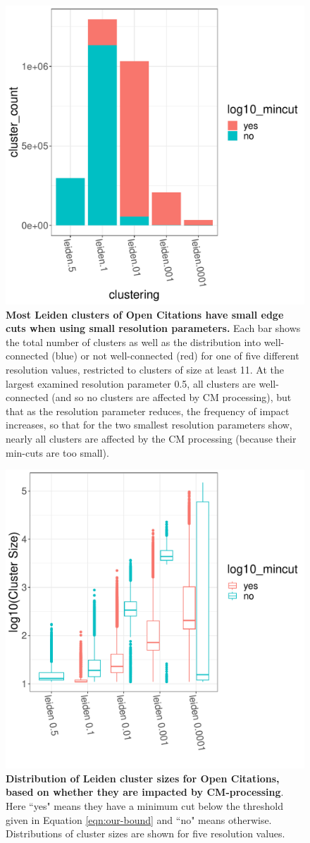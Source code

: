 \documentclass[11pt]{article}   	%
\begin{document}
\begin{figure}[H]
\centering
\includegraphics[width=0.4\linewidth]{figs/oc_istouched.pdf}
\caption{\textbf{Most Leiden clusters of Open Citations have small edge cuts when using small resolution parameters.}   Each bar shows the total number of clusters as well as the distribution into well-connected (blue) or not well-connected (red) for  one of five different resolution values, restricted to clusters of size at least 11. At the largest examined resolution parameter 0.5, all clusters are well-connected (and so no clusters are affected by CM processing), but that as the resolution parameter reduces, the frequency of impact increases,
so that for the two smallest resolution parameters show, nearly all clusters are affected by the CM processing (because their min-cuts are too small).}
\label{fig:ocistouched-part1}
\end{figure}

\begin{figure}[H]
\centering
\includegraphics[width=0.4\linewidth]{figs/oc_boxplot.pdf}
\caption{\textbf{Distribution of Leiden cluster sizes for Open Citations, based on whether they are impacted by CM-processing}. Here ``yes"  means they have a minimum cut below the threshold given in Equation \ref{eqn:our-bound} and ``no"  means otherwise.  Distributions of cluster sizes  are shown for five resolution values.}
\label{fig:ocistouched-part2}
\end{figure}
\end{document}
